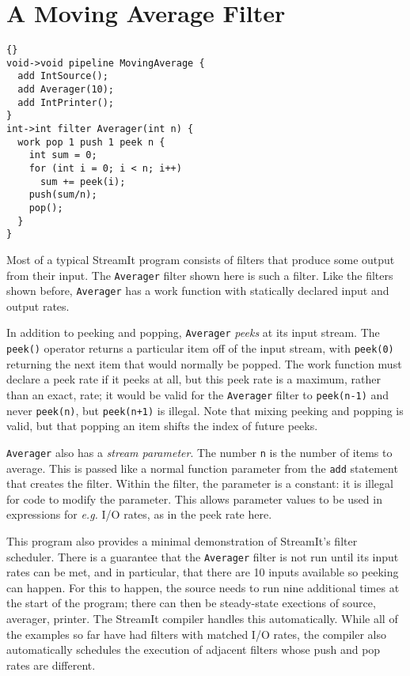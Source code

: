 \section{A Moving Average Filter}

\begin{lstlisting}{}
void->void pipeline MovingAverage {
  add IntSource();
  add Averager(10);
  add IntPrinter();
}
int->int filter Averager(int n) {
  work pop 1 push 1 peek n {
    int sum = 0;
    for (int i = 0; i < n; i++)
      sum += peek(i);
    push(sum/n);
    pop();
  }
}
\end{lstlisting}

Most of a typical StreamIt program consists of filters that produce
some output from their input.  The \lstinline|Averager| filter shown
here is such a filter.  Like the filters shown before,
\lstinline|Averager| has a work function with statically declared
input and output rates.

In addition to peeking and popping, \lstinline|Averager| \emph{peeks}
at its input stream.  The \lstinline|peek()| operator returns a
particular item off of the input stream, with \lstinline|peek(0)|
returning the next item that would normally be popped.  The work
function must declare a peek rate if it peeks at all, but this peek
rate is a maximum, rather than an exact, rate; it would be valid for
the \lstinline|Averager| filter to \lstinline|peek(n-1)| and never
\lstinline|peek(n)|, but \lstinline|peek(n+1)| is illegal.  Note that
mixing peeking and popping is valid, but that popping an item shifts
the index of future peeks.

\lstinline|Averager| also has a \emph{stream parameter}.  The number
\lstinline|n| is the number of items to average.  This is passed like
a normal function parameter from the \lstinline|add| statement that
creates the filter.  Within the filter, the parameter is a constant:
it is illegal for code to modify the parameter.  This allows parameter
values to be used in expressions for \emph{e.g.} I/O rates, as in the
peek rate here.

This program also provides a minimal demonstration of StreamIt's
filter scheduler.  There is a guarantee that the \lstinline|Averager|
filter is not run until its input rates can be met, and in particular,
that there are 10 inputs available so peeking can happen.  For this to
happen, the source needs to run nine additional times at the start of
the program; there can then be steady-state exections of source,
averager, printer.  The StreamIt compiler handles this automatically.
While all of the examples so far have had filters with matched I/O
rates, the compiler also automatically schedules the execution of
adjacent filters whose push and pop rates are different.

